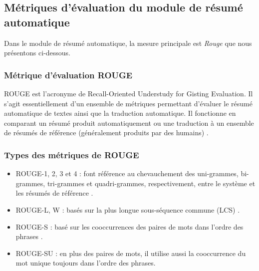     \subsection{Métriques d'évaluation du module de résumé automatique}
    Dans le module de résumé automatique, la mesure principale est \emph{Rouge} que nous présentons ci-dessous.

        \subsubsection{Métrique d'évaluation ROUGE\label{metrique-eval}}
        ROUGE est l'acronyme de \textquotedbl Recall-Oriented Understudy for Gisting Evaluation\textquotedbl. Il s'agit essentiellement d'un ensemble de métriques permettant d'évaluer le résumé automatique de textes ainsi que la traduction automatique. Il fonctionne en comparant un résumé produit automatiquement ou une traduction à un ensemble de résumés de référence (généralement produits par des humains) \cite{rouge0}.

        \subsubsection{Types des métriques de ROUGE\label{type-rouge}}
        \begin{itemize}
            \item{ROUGE-1, 2, 3 et 4 : font référence au chevauchement des uni-grammes, bi-grammes, tri-grammes et quadri-grammes, respectivement, entre le système et les résumés de référence \cite{rouge1}.}\\
            \item{ROUGE-L, W : basés sur la plus longue sous-séquence commune (LCS) \cite{rouge2}.}\\
            \item{ROUGE-S : basé sur les cooccurrences des paires de mots dans l'ordre des phrases \cite{rouge2}.}\\
            \item{ROUGE-SU : en plus des paires de mots, il utilise aussi la cooccurrence du mot unique toujours dans l'ordre des phrases.}
        \end{itemize}

